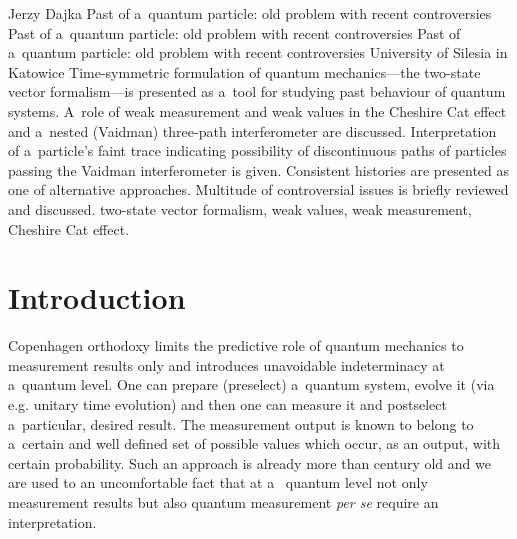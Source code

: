 \begin{artengenv}{Jerzy Dajka}
	{Past of a~quantum particle: old problem with recent controversies}
	{Past of a~quantum particle: old problem with recent controversies}
	{Past of a~quantum particle: old problem with recent controversies}
	{University of Silesia in Katowice}
	{Time-symmetric formulation of quantum mechanics---the two-state vector formalism---is presented  as a~tool for studying past behaviour of quantum systems. A~role of weak measurement and weak values in the Cheshire Cat effect and a~nested (Vaidman) three-path interferometer are discussed. Interpretation of a~particle's faint trace indicating possibility of discontinuous  paths of particles passing  the Vaidman interferometer is given.   Consistent histories are presented as one of  alternative approaches.  Multitude of controversial issues is briefly reviewed and discussed. }
	{two-state vector formalism, weak values, weak measurement, Cheshire Cat effect.}



\section{Introduction}
\lettrine[loversize=0.13,lines=2,lraise=-0.01,nindent=0em,findent=0.2pt]%
{C}{}openhagen orthodoxy limits the predictive role of quantum mechanics to measurement results only and introduces unavoidable indeterminacy at a~quantum level. One can prepare (preselect) a~quantum system, evolve it (via e.g. unitary time evolution) and then one can measure it and postselect a~particular, desired result. The measurement output is known to belong to a~certain and well defined set of possible values which occur, as an output, with certain probability. Such an approach is already more than century old and we are used to an uncomfortable fact that at a~ quantum level not only measurement results but also quantum measurement {\it per se} require an interpretation. 


\end{artengenv}
